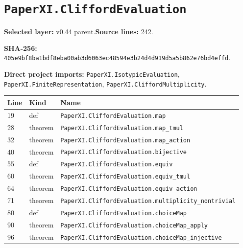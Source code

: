 \documentclass[10pt,oneside]{book}
\begin{document}
\section{\texorpdfstring{\nolinkurl{PaperXI.CliffordEvaluation}}{PaperXI.CliffordEvaluation}}\label{module:PaperXI.CliffordEvaluation}

\textbf{Selected layer:} v0.44 parent.\quad\textbf{Source lines:} 242.\par\textbf{SHA-256:} {\scriptsize\nolinkurl{405e9bf8ba1bdf8eba00ab3d6063ec48594e3b24d4d919d5a5b862e76bd4effd}}.

\textbf{Direct project imports:} \nolinkurl{PaperXI.IsotypicEvaluation}, \nolinkurl{PaperXI.FiniteRepresentation}, \nolinkurl{PaperXI.CliffordMultiplicity}.

\begin{longtable}{@{}p{}p{}p{}@{}}\toprule Line&Kind&Name\\\midrule\endhead

19&def&\nolinkurl{PaperXI.CliffordEvaluation.map}\\

28&theorem&\nolinkurl{PaperXI.CliffordEvaluation.map_tmul}\\

32&theorem&\nolinkurl{PaperXI.CliffordEvaluation.map_action}\\

40&theorem&\nolinkurl{PaperXI.CliffordEvaluation.bijective}\\

55&def&\nolinkurl{PaperXI.CliffordEvaluation.equiv}\\

60&theorem&\nolinkurl{PaperXI.CliffordEvaluation.equiv_tmul}\\

64&theorem&\nolinkurl{PaperXI.CliffordEvaluation.equiv_action}\\

71&theorem&\nolinkurl{PaperXI.CliffordEvaluation.multiplicity_nontrivial}\\

80&def&\nolinkurl{PaperXI.CliffordEvaluation.choiceMap}\\

90&theorem&\nolinkurl{PaperXI.CliffordEvaluation.choiceMap_apply}\\

96&theorem&\nolinkurl{PaperXI.CliffordEvaluation.choiceMap_injective}\\


\end{longtable}
\end{document}
